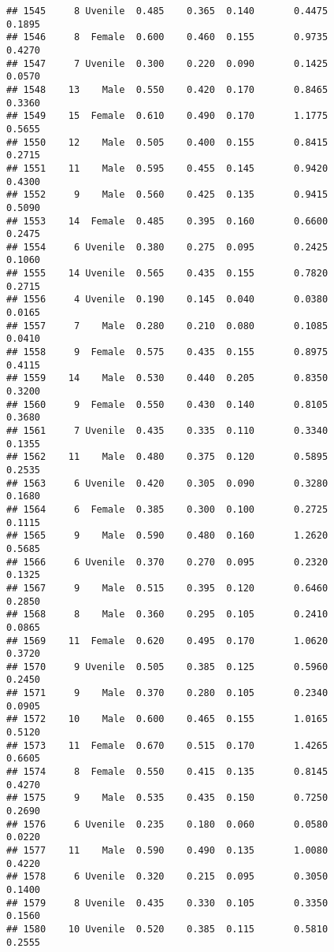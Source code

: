 \documentclass[
]{article}
\begin{document}
\begin{verbatim}
## 1545     8 Uvenile  0.485    0.365  0.140       0.4475         0.1895
## 1546     8  Female  0.600    0.460  0.155       0.9735         0.4270
## 1547     7 Uvenile  0.300    0.220  0.090       0.1425         0.0570
## 1548    13    Male  0.550    0.420  0.170       0.8465         0.3360
## 1549    15  Female  0.610    0.490  0.170       1.1775         0.5655
## 1550    12    Male  0.505    0.400  0.155       0.8415         0.2715
## 1551    11    Male  0.595    0.455  0.145       0.9420         0.4300
## 1552     9    Male  0.560    0.425  0.135       0.9415         0.5090
## 1553    14  Female  0.485    0.395  0.160       0.6600         0.2475
## 1554     6 Uvenile  0.380    0.275  0.095       0.2425         0.1060
## 1555    14 Uvenile  0.565    0.435  0.155       0.7820         0.2715
## 1556     4 Uvenile  0.190    0.145  0.040       0.0380         0.0165
## 1557     7    Male  0.280    0.210  0.080       0.1085         0.0410
## 1558     9  Female  0.575    0.435  0.155       0.8975         0.4115
## 1559    14    Male  0.530    0.440  0.205       0.8350         0.3200
## 1560     9  Female  0.550    0.430  0.140       0.8105         0.3680
## 1561     7 Uvenile  0.435    0.335  0.110       0.3340         0.1355
## 1562    11    Male  0.480    0.375  0.120       0.5895         0.2535
## 1563     6 Uvenile  0.420    0.305  0.090       0.3280         0.1680
## 1564     6  Female  0.385    0.300  0.100       0.2725         0.1115
## 1565     9    Male  0.590    0.480  0.160       1.2620         0.5685
## 1566     6 Uvenile  0.370    0.270  0.095       0.2320         0.1325
## 1567     9    Male  0.515    0.395  0.120       0.6460         0.2850
## 1568     8    Male  0.360    0.295  0.105       0.2410         0.0865
## 1569    11  Female  0.620    0.495  0.170       1.0620         0.3720
## 1570     9 Uvenile  0.505    0.385  0.125       0.5960         0.2450
## 1571     9    Male  0.370    0.280  0.105       0.2340         0.0905
## 1572    10    Male  0.600    0.465  0.155       1.0165         0.5120
## 1573    11  Female  0.670    0.515  0.170       1.4265         0.6605
## 1574     8  Female  0.550    0.415  0.135       0.8145         0.4270
## 1575     9    Male  0.535    0.435  0.150       0.7250         0.2690
## 1576     6 Uvenile  0.235    0.180  0.060       0.0580         0.0220
## 1577    11    Male  0.590    0.490  0.135       1.0080         0.4220
## 1578     6 Uvenile  0.320    0.215  0.095       0.3050         0.1400
## 1579     8 Uvenile  0.435    0.330  0.105       0.3350         0.1560
## 1580    10 Uvenile  0.520    0.385  0.115       0.5810         0.2555

\end{verbatim}
\end{document}
